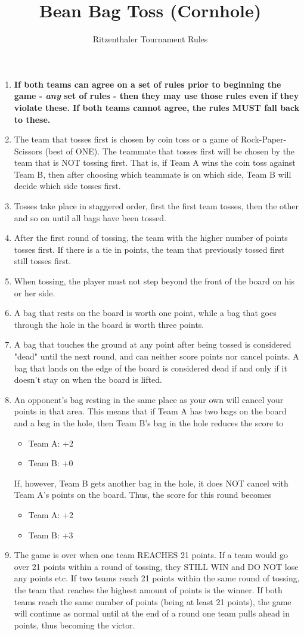 \documentclass[a4paper]{article}
\title{Bean Bag Toss (Cornhole)}
\author{Ritzenthaler Tournament Rules}
\begin{document}
\maketitle
\begin{enumerate}
\item \textbf{If both teams can agree on a set of rules prior to beginning the game - \textit{any} set of rules - then they may use those rules even if they violate these. If both teams cannot agree, the rules MUST fall back to these.}
\item The team that tosses first is chosen by coin toss or a game of Rock-Paper-Scissors (best of ONE). The teammate that tosses first will be chosen by the team that is NOT tossing first. That is, if Team A wins the coin toss against Team B, then after choosing which teammate is on which side, Team B will decide which side tosses first.
\item Tosses take place in staggered order, first the first team tosses, then the other and so on until all bags have been tossed.
\item After the first round of tossing, the team with the higher number of points tosses first. If there is a tie in points, the team that previously tossed first still tosses first.
\item When tossing, the player must not step beyond the front of the board on his or her side.
\item A bag that rests on the board is worth one point, while a bag that goes through the hole in the board is worth three points.
\item A bag that touches the ground at any point after being tossed is considered "dead" until the next round, and can neither score points nor cancel points. A bag that lands on the edge of the board is considered dead if and only if it doesn't stay on when the board is lifted.
\item An opponent's bag resting in the same place as your own will cancel your points in that area. This means that if Team A has two bags on the board and a bag in the hole, then Team B's bag in the hole reduces the score to
	\begin{itemize}
		\item Team A: +2
		\item Team B: +0
	\end{itemize}
If, however, Team B gets another bag in the hole, it does NOT cancel with Team A's points on the board. Thus, the score for this round becomes
	\begin{itemize}
		\item Team A: +2
		\item Team B: +3
	\end{itemize}
\item The game is over when one team REACHES 21 points. If a team would go over 21 points within a round of tossing, they STILL WIN and DO NOT lose any points etc. If two teams reach 21 points within the same round of tossing, the team that reaches the highest amount of points is the winner. If both teams reach the same number of points (being at least 21 points), the game will continue as normal until at the end of a round one team pulls ahead in points, thus becoming the victor.
\end{enumerate}
\end{document}
